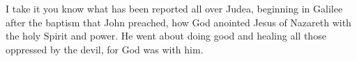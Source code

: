 
\lettrine{I}{} take it you know what has been reported all over Judea, beginning in Galilee after the baptism that John preached, how God anointed Jesus of Nazareth with the holy Spirit and power. He went about doing good and healing all those oppressed by the devil, for God was with him.